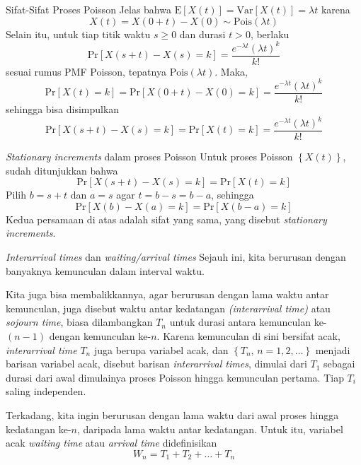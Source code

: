\documentclass{beamer}
\newcommand{\pars}[1]{\left(#1\right)}
\newcommand{\brackets}[1]{\left[#1\right]}
\newcommand{\braces}[1]{\left\{#1\right\}}
\begin{document}
\begin{frame}{Sifat-Sifat Proses Poisson}
    Jelas bahwa \(\text{E}\brackets{X(t)} = \text{Var}\brackets{X(t)} = \lambda t\) karena
    \[X(t) = X(0+t) - X(0) \sim \text{Pois}(\lambda t)\]
    Selain itu, untuk tiap titik waktu \(s \ge 0\) dan durasi \(t > 0\), berlaku
    \[\text{Pr}\brackets{X(s+t) - X(s) = k} = \frac{e^{-\lambda t}\pars{\lambda t}^k}{k!}\]
    sesuai rumus PMF Poisson, tepatnya \(\text{Pois}(\lambda t)\). Maka,
    \[\text{Pr}\brackets{X(t) = k} = \text{Pr}\brackets{X(0+t) - X(0) = k} = \frac{e^{-\lambda t}\pars{\lambda t}^k}{k!}\]
    sehingga bisa disimpulkan
    \[\text{Pr}\brackets{X(s+t) - X(s) = k} = \text{Pr}\brackets{X(t) = k} = \frac{e^{-\lambda t}\pars{\lambda t}^k}{k!}\]
\end{frame}

\begin{frame}{\textit{Stationary increments} dalam proses Poisson}
    Untuk proses Poisson \(\braces{X(t)}\), sudah ditunjukkan bahwa
    \[\text{Pr}\brackets{X(s+t) - X(s) = k} = \text{Pr}\brackets{X(t) = k}\]
    Pilih \(b = s+t\) dan \(a = s\) agar \(t = b-s = b-a\), sehingga
    \[\text{Pr}\brackets{X(b) - X(a) = k} = \text{Pr}\brackets{X\pars{b-a} = k}\]
    Kedua persamaan di atas adalah sifat yang sama, yang disebut \textit{stationary increments}.
\end{frame}

\begin{frame}{\textit{Interarrival times} dan \textit{waiting/arrival times}}
    Sejauh ini, kita berurusan dengan banyaknya kemunculan dalam interval waktu.
    
    Kita juga bisa membalikkannya, agar berurusan dengan lama waktu antar kemunculan, juga disebut waktu antar kedatangan \textit{(interarrival time)} atau \textit{sojourn time}, biasa dilambangkan \( T_n \) untuk durasi antara kemunculan ke-\((n-1)\) dengan kemunculan ke-\(n\). Karena kemunculan di sini bersifat acak, \textit{interarrival time} \(T_n\) juga berupa variabel acak, dan \(\braces{T_n, \, n=1,2,\dots}\) menjadi barisan variabel acak, disebut barisan \textit{interarrival times}, dimulai dari \(T_1\) sebagai durasi dari awal dimulainya proses Poisson hingga kemunculan pertama. Tiap \(T_i\) saling independen.

    Terkadang, kita ingin berurusan dengan lama waktu dari awal proses hingga kedatangan ke-\(n\), daripada lama waktu antar kedatangan. Untuk itu, variabel acak \textit{waiting time} atau \textit{arrival time} didefinisikan
    \[W_n = T_1 + T_2 + \dots + T_n\]
\end{frame}
\end{document}
